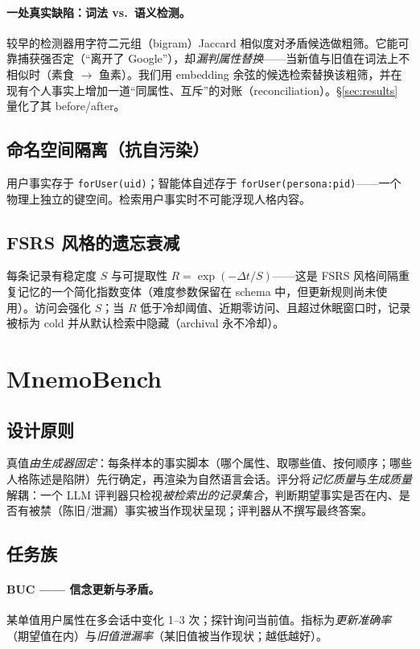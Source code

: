 \documentclass[11pt,fontset=fandol]{ctexart}
\begin{document}
\paragraph{一处真实缺陷：词法 vs.\ 语义检测。}较早的检测器用字符二元组（bigram）Jaccard 相似度对矛盾候选做粗筛。它能可靠捕获强否定（“离开了 Google”），却\emph{漏判属性替换}——当新值与旧值在词法上不相似时（素食 $\rightarrow$ 鱼素）。我们用 embedding 余弦的候选检索替换该粗筛，并在现有个人事实上增加一道“同属性、互斥”的对账（reconciliation）。\S\ref{sec:results} 量化了其 before/after。
\subsection{命名空间隔离（抗自污染）}
用户事实存于 \texttt{forUser(uid)}；智能体自述存于 \texttt{forUser(persona:pid)}——一个物理上独立的键空间。检索用户事实时不可能浮现人格内容。
\subsection{FSRS 风格的遗忘衰减}
每条记录有稳定度 $S$ 与可提取性 $R=\exp(-\Delta t / S)$——这是 FSRS 风格间隔重复记忆的一个简化指数变体（难度参数保留在 schema 中，但更新规则尚未使用）。访问会强化 $S$；当 $R$ 低于冷却阈值、近期零访问、且超过休眠窗口时，记录被标为 cold 并从默认检索中隐藏（archival 永不冷却）。

\section{MnemoBench}
\label{sec:bench}
\subsection{设计原则}
真值\emph{由生成器固定}：每条样本的事实脚本（哪个属性、取哪些值、按何顺序；哪些人格陈述是陷阱）先行确定，再渲染为自然语言会话。评分将\emph{记忆质量}与\emph{生成质量}解耦：一个 LLM 评判器只检视\emph{被检索出的记录集合}，判断期望事实是否在内、是否有被禁（陈旧/泄漏）事实被当作现状呈现；评判器从不撰写最终答案。
\subsection{任务族}
\paragraph{BUC —— 信念更新与矛盾。}某单值用户属性在多会话中变化 1--3 次；探针询问当前值。指标为\emph{更新准确率}（期望值在内）与\emph{旧值泄漏率}（某旧值被当作现状；越低越好）。
\end{document}
